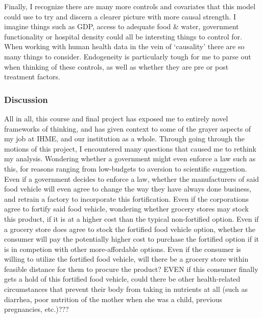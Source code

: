 \documentclass[]{article}
\begin{document}
Finally, I recognize there are many more controls and covariates that
this model could use to try and discern a clearer picture with more
causal strength. I imagine things such as GDP, access to adequate food
\& water, government functionality or hospital density could all be
intersting things to control for. When working with human health data in
the vein of `causality' there are so many things to consider.
Endogeneity is particularly tough for me to parse out when thinking of
these controls, as well as whether they are pre or post treatment
factors.

\subsubsection{Discussion}\label{discussion}

All in all, this course and final project has exposed me to entirely
novel frameworks of thinking, and has given context to some of the
grayer aspects of my job at IHME, and our institution as a whole.
Through going through the motions of this project, I encountered many
questions that caused me to rethink my analysis. Wondering whether a
government might even enforce a law such as this, for reasons ranging
from low-budgets to aversion to scientific suggestion. Even if a
government decides to enforce a law, whether the manufacturers of said
food vehicle will even agree to change the way they have always done
business, and retrain a factory to incorporate this fortification. Even
if the corporations agree to fortify said food vehicle, wondering
whether grocery stores may stock this product, if it is at a higher cost
than the typical non-fortified option. Even if a grocery store does
agree to stock the fortified food vehicle option, whether the consumer
will pay the potentially higher cost to purchase the fortified option if
it is in competion with other more-affordable options. Even if the
consumer is willing to utilize the fortified food vehicle, will there be
a grocery store within feasible distance for them to procure the
product? EVEN if this consumer finally gets a hold of this fortified
food vehicle, could there be other health-related circumstances that
prevent their body from taking in nutrients at all (such as diarrhea,
poor nutrition of the mother when she was a child, previous pregnancies,
etc.)???
\end{document}
